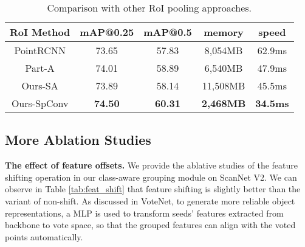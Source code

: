 \documentclass{article}
\begin{document}
\begin{table}[h]
  	\caption{Comparison with other RoI pooling approaches.}
  	\label{tab:roi_ab}
  	\small
  	\centering
   	\begin{tabular}{ccccc}
    	\toprule
    	RoI Method &mAP@0.25 & mAP@0.5 & memory & speed\\
    	\midrule
    	PointRCNN   & 73.65        & 57.83    & 8,054MB   & 62.9ms \\
    	Part-A        & 74.01        & 58.89   & 6,540MB  & 47.9ms \\
    	Ours-SA	      & 73.89        & 58.14   & 11,508MB   & 45.5ms  \\
    	Ours-SpConv		  & \textbf{74.50}        & \textbf{60.31}    & \textbf{2,468MB}  & \textbf{34.5ms} \\
\bottomrule
  	\end{tabular}
\end{table}

\subsection{More Ablation Studies}
\label{sec:more_ab}
\noindent\textbf{The effect of feature offsets.} We provide the ablative studies of the feature shifting operation in our class-aware grouping module on ScanNet V2. We can observe in Table \ref{tab:feat_shift} that feature shifting is slightly better than the variant of non-shift. As discussed in VoteNet, to generate more reliable object representations, a MLP is used to transform seeds’ features extracted from backbone to vote space, so that the grouped features can align with the voted points automatically.
\end{document}
